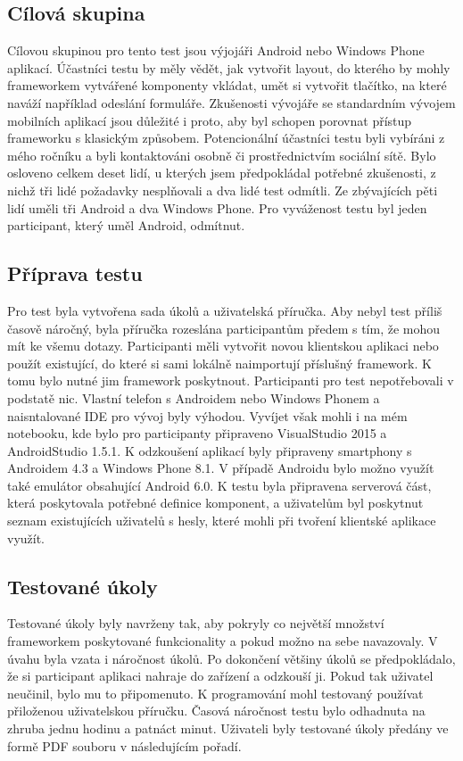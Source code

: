 \subsection{Cílová skupina}
Cílovou skupinou pro tento test jsou výjojáři Android nebo Windows Phone aplikací. Účastníci testu by měly vědět, jak vytvořit layout, do kterého by mohly frameworkem vytvářené komponenty vkládat, umět si vytvořit tlačítko, na které naváží například odeslání formuláře. Zkušenosti vývojáře se standardním vývojem mobilních aplikací jsou důležité i proto, aby byl schopen porovnat přístup frameworku s klasickým způsobem. Potencionální účastníci testu byli vybíráni z mého ročníku a byli kontaktováni osobně či prostřednictvím sociální sítě. Bylo osloveno celkem deset lidí, u kterých jsem předpokládal potřebné zkušenosti, z nichž tři lidé požadavky nesplňovali a dva lidé test odmítli. Ze zbývajících pěti lidí uměli tři Android a dva Windows Phone. Pro vyváženost testu byl jeden participant, který uměl Android, odmítnut.    

\subsection{Příprava testu}	
Pro test byla vytvořena sada úkolů a uživatelská příručka. Aby nebyl test příliš časově náročný, byla příručka rozeslána participantům předem s tím, že mohou mít ke všemu dotazy. Participanti měli vytvořit novou klientskou aplikaci nebo použít existující, do které si sami lokálně naimportují příslušný framework. K tomu bylo nutné jim framework poskytnout. Participanti pro test nepotřebovali v podstatě nic. Vlastní telefon s Androidem nebo Windows Phonem a naisntalované IDE pro vývoj byly výhodou. Vyvíjet však mohli i na mém notebooku, kde bylo pro participanty připraveno VisualStudio 2015 a AndroidStudio 1.5.1. K odzkoušení aplikací byly připraveny smartphony s Androidem 4.3 a Windows Phone 8.1. V případě Androidu bylo možno využít také emulátor obsahující Android 6.0. K testu byla připravena serverová část, která poskytovala potřebné definice komponent, a uživatelům byl poskytnut seznam existujících uživatelů s hesly, které mohli při tvoření klientské aplikace využít.
 
\subsection{Testované úkoly}
Testované úkoly byly navrženy tak, aby pokryly co největší množství frameworkem poskytované funkcionality a pokud možno na sebe navazovaly. V úvahu byla vzata i náročnost úkolů. Po dokončení většiny úkolů se předpokládalo, že si participant aplikaci nahraje do zařízení a odzkouší ji. Pokud tak uživatel neučinil, bylo mu to připomenuto. K programování mohl testovaný používat přiloženou uživatelskou příručku. Časová náročnost testu bylo odhadnuta na zhruba jednu hodinu a patnáct minut. Uživateli byly testované úkoly předány ve formě PDF souboru v následujícím pořadí.

